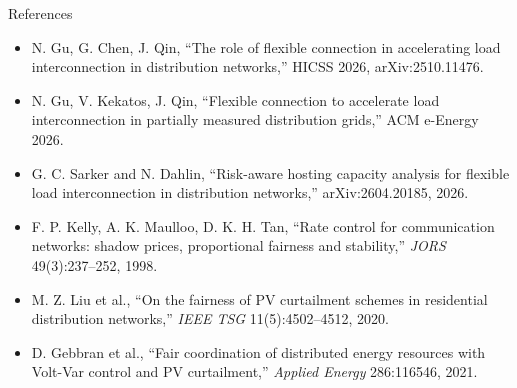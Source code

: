\documentclass[aspectratio=169,11pt]{beamer}
\begin{document}
\begin{frame}[allowframebreaks]{References}
\begin{itemize}
    \item N. Gu, G. Chen, J. Qin, ``The role of flexible connection in accelerating load interconnection in distribution networks,'' HICSS 2026, arXiv:2510.11476.
    \item N. Gu, V. Kekatos, J. Qin, ``Flexible connection to accelerate load interconnection in partially measured distribution grids,'' ACM e-Energy 2026.
    \item G. C. Sarker and N. Dahlin, ``Risk-aware hosting capacity analysis for flexible load interconnection in distribution networks,'' arXiv:2604.20185, 2026.
    \item F. P. Kelly, A. K. Maulloo, D. K. H. Tan, ``Rate control for communication networks: shadow prices, proportional fairness and stability,'' \emph{JORS} 49(3):237--252, 1998.
    \item M. Z. Liu et al., ``On the fairness of PV curtailment schemes in residential distribution networks,'' \emph{IEEE TSG} 11(5):4502--4512, 2020.
    \item D. Gebbran et al., ``Fair coordination of distributed energy resources with Volt-Var control and PV curtailment,'' \emph{Applied Energy} 286:116546, 2021.
  \end{itemize}
\end{frame}
\end{document}
